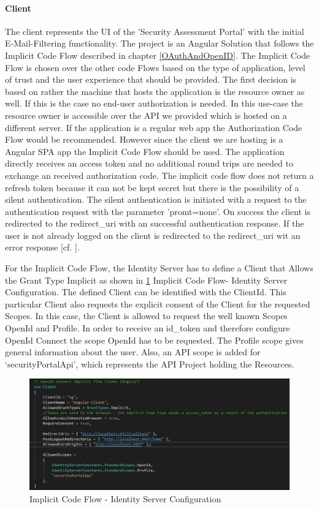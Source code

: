 \paragraph{Client}The client represents the UI of the 'Security Assessment Portal' with the initial E-Mail-Filtering functionality. The project is an Angular Solution that follows the Implicit Code Flow described in chapter \ref{OAuthAndOpenID}. The Implicit Code Flow is chosen over the other code Flows based on the type of application, level of trust and the user experience that should be provided. The first decision is based on rather the machine that hosts the application is the resource owner as well. If this is the case no end-user authorization is needed. In this use-case the resource owner is accessible over the API we provided which is hosted on a different server. If the application is a regular web app the Authorization Code Flow would be recommended. However since the client we are hosting is a Angular SPA app the Implicit Code Flow should be used. The application directly receives an access token and no additional round trips are needed to exchange an received authorization code. The implicit code flow does not return a refresh token because it can not be kept secret but there is the possibility of a silent authentication. The silent authentication is initiated with a request to the authentication request with the parameter 'promt=none'. On success the client is redirected to the redirect\_uri with an successful authentication response. If the user is not already logged on the client is redirected to the redirect\_uri wit an error response [cf. \cite{OAuth:2018:Flow}].  


For the Implicit Code Flow, the Identity Server has to define a Client that Allows the Grant Type Implicit as shown in \ref{fig:implicitcodeflow} Implicit Code Flow- Identity Server Configuration. The defined Client can be identified with the ClientId. This particular Client also requests the explicit consent of the Client for the requested Scopes. In this case, the Client is allowed to request the well known Scopes OpenId and Profile. In order to receive an id\_token and therefore configure OpenId Connect the scope OpenId has to be requested. The Profile scope gives general information about the user. Also, an API scope is added for ‘securityPortalApi’, which represents the API Project holding the Resources. 

\begin{figure}[h]
	\centering
	\includegraphics[width=0.8\linewidth]{images/implicit_code_flow}
	\caption{Implicit Code Flow - Identity Server Configuration}
	\label{fig:implicitcodeflow}
\end{figure}


